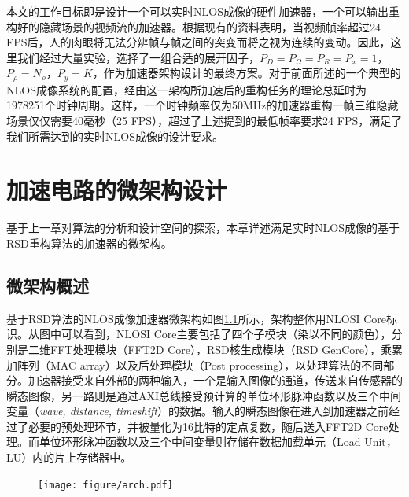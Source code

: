 \documentclass[master]{shtthesis}             %
\begin{document}
本文的工作目标即是设计一个可以实时NLOS成像的硬件加速器，一个可以输出重构好的隐藏场景的视频流的加速器。根据现有的资料表明，当视频帧率超过24 FPS后，人的肉眼将无法分辨帧与帧之间的突变而将之视为连续的变动。因此，这里我们经过大量实验，选择了一组合适的展开因子，$P_D=P_\Omega=P_R=P_x=1$，$P_\rho=N_\rho$，$P_y=K$，作为加速器架构设计的最终方案。对于前面所述的一个典型的NLOS成像系统的配置，经由这一架构所加速后的重构任务的理论总延时为1978251个时钟周期。这样，一个时钟频率仅为50MHz的加速器重构一帧三维隐藏场景仅仅需要40毫秒（25 FPS），超过了上述提到的最低帧率要求24 FPS，满足了我们所需达到的实时NLOS成像的设计要求。%

\chapter{加速电路的微架构设计}

基于上一章对算法的分析和设计空间的探索，本章详述满足实时NLOS成像的基于RSD重构算法的加速器的微架构。

\section{微架构概述} \label{sec::setup_info}

基于RSD算法的NLOS成像加速器微架构如图\ref{fig:arch}所示，架构整体用NLOSI Core标识。从图中可以看到，NLOSI Core主要包括了四个子模块（染以不同的颜色），分别是二维FFT处理模块（FFT2D Core），RSD核生成模块（RSD GenCore），乘累加阵列（MAC array）以及后处理模块（Post processing），以处理算法的不同部分。加速器接受来自外部的两种输入，一个是输入图像的通道，传送来自传感器的瞬态图像，另一路则是通过AXI总线接受预计算的单位环形脉冲函数以及三个中间变量（\textit{wave, distance, timeshift}）的数据。输入的瞬态图像在进入到加速器之前经过了必要的预处理环节，并被量化为16比特的定点复数，随后送入FFT2D Core处理。而单位环形脉冲函数以及三个中间变量则存储在数据加载单元（Load Unit，LU）内的片上存储器中。
\begin{figure}[!htb]
    \centering
    \texttt{[image: figure/arch.pdf]}
    \label{fig:arch}
\end{figure}
\end{document}
